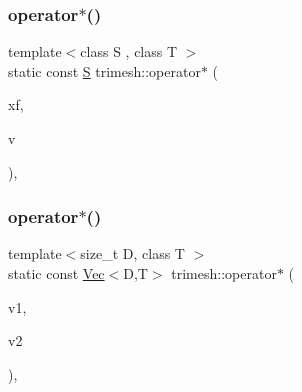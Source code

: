 \mbox{\label{namespacetrimesh_a1babd12d169622c171cacddf86e6ae1a}} 
\subsubsection{\texorpdfstring{operator$\ast$()}{operator*()}\hspace{0.1cm}{\footnotesize\ttfamily [2/3]}}
{\footnotesize\ttfamily template$<$class S , class T $>$ \\
static const \hyperlink{ego_8cc_abde73cd36321648268fb4543509b996a}{S} trimesh\+::operator$\ast$ (\begin{DoxyParamCaption}\item[{const \hyperlink{classtrimesh_1_1XForm}{X\+Form}$<$ T $>$ \&}]{xf,  }\item[{const \hyperlink{ego_8cc_abde73cd36321648268fb4543509b996a}{S} \&}]{v }\end{DoxyParamCaption})\hspace{0.3cm}{\ttfamily [inline]}, {\ttfamily [static]}}

\mbox{\label{namespacetrimesh_ace541ccec2282abfc3a3ed58c1c86ca7}} 
\subsubsection{\texorpdfstring{operator$\ast$()}{operator*()}\hspace{0.1cm}{\footnotesize\ttfamily [3/3]}}
{\footnotesize\ttfamily template$<$size\+\_\+t D, class T $>$ \\
static const \hyperlink{classtrimesh_1_1Vec}{Vec}$<$D,T$>$ trimesh\+::operator$\ast$ (\begin{DoxyParamCaption}\item[{const \hyperlink{classtrimesh_1_1Vec}{Vec}$<$ D, T $>$ \&}]{v1,  }\item[{const \hyperlink{classtrimesh_1_1Vec}{Vec}$<$ D, T $>$ \&}]{v2 }\end{DoxyParamCaption})\hspace{0.3cm}{\ttfamily [inline]}, {\ttfamily [static]}}

\mbox{\label{namespacetrimesh_a2cf4a60d0201f630995ed0b4ba7c375d}} 
